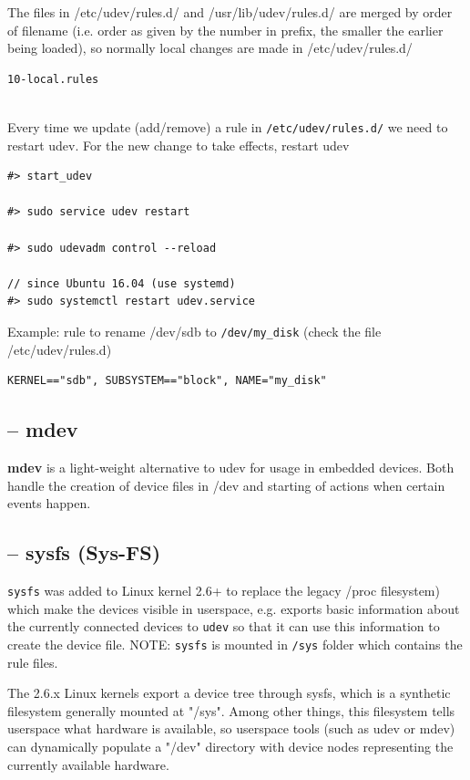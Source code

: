 The files in /etc/udev/rules.d/ and /usr/lib/udev/rules.d/ are merged by order
of filename (i.e. order as given by the number in prefix, the smaller the
earlier being loaded), so normally local changes are made in /etc/udev/rules.d/

\begin{verbatim}
10-local.rules


\end{verbatim}


Every time we update (add/remove) a rule in \verb!/etc/udev/rules.d/! we need to
restart udev. For the new change to take effects, restart udev
\begin{verbatim}
#> start_udev

#> sudo service udev restart

#> sudo udevadm control --reload

// since Ubuntu 16.04 (use systemd)
#> sudo systemctl restart udev.service
\end{verbatim}


Example: rule to rename /dev/sdb to \verb!/dev/my_disk! (check the
file /etc/udev/rules.d)
\begin{verbatim}
KERNEL=="sdb", SUBSYSTEM=="block", NAME="my_disk"
\end{verbatim}

\subsection{-- mdev}
\label{sec:mdev}

{\bf mdev} is a light-weight alternative to udev for usage in embedded devices.
Both handle the creation of device files in /dev and starting of actions when
certain events happen.


\subsection{-- sysfs (Sys-FS)}
\label{sec:sysfs}

\verb!sysfs! was added to Linux kernel 2.6+ to replace the legacy /proc
filesystem) which make the devices visible in userspace, e.g. exports basic
information about the currently connected devices to \verb!udev! so that it can
use this information to create the device file. NOTE: \verb!sysfs! is mounted in
\verb!/sys! folder which contains the rule files.

The 2.6.x Linux kernels export a device tree through sysfs, which is a
synthetic filesystem generally mounted at "/sys".
Among other things,
this filesystem tells userspace what hardware is available, so userspace tools
(such as udev or mdev) can dynamically populate a "/dev" directory with device
nodes representing the currently available hardware.

